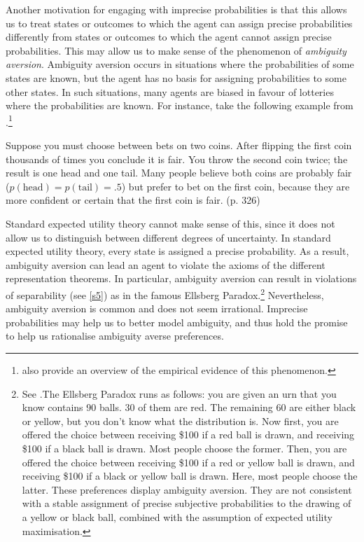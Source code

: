 Another motivation for engaging with imprecise probabilities is that this allows us to treat states or outcomes to which the agent can assign precise probabilities differently from states or outcomes to which the agent cannot assign precise probabilities. This may allow us to make sense of the phenomenon of {\em ambiguity aversion}. Ambiguity aversion occurs in situations where the probabilities of some states are known, but the agent has no basis for assigning probabilities to some other states. In such situations, many agents are biased in favour of lotteries where the probabilities are known. For instance, take the following example from \citet{CamererWeber1992}.\footnote{\citet{CamererWeber1992} also provide an overview of the empirical evidence of this phenomenon.}

\begin{displayquote}
Suppose you must choose between bets on two coins. After flipping the first coin thousands of times you conclude it is fair. You throw the second coin twice; the result is one head and one tail. Many people believe both coins are probably fair ($p(\text{head}) = p(\text{tail})=.5$) but prefer to bet on the first coin, because they are more confident or certain that the first coin is fair. (p. 326)
\end{displayquote}

Standard expected utility theory cannot make sense of this, since it does not allow us to distinguish between different degrees of uncertainty. In standard expected utility theory, every state is assigned a precise probability. As a result, ambiguity aversion can lead an agent to violate the axioms of the different representation theorems. In particular, ambiguity aversion can result in violations of separability (see \autoref{s5}) as in the famous Ellsberg Paradox.\footnote{See \citet{Ellsberg1961}.The Ellsberg Paradox runs as follows: you are given an urn that you know contains 90 balls. 30 of them are red. The remaining 60 are either black or yellow, but you don't know what the distribution is. Now first, you are offered the choice between receiving \$100 if a red ball is drawn, and receiving \$100 if a black ball is drawn. Most people choose the former. Then, you are offered the choice between receiving \$100 if a red or yellow ball is drawn, and receiving \$100 if a black or yellow ball is drawn. Here, most people choose the latter. These preferences display ambiguity aversion. They are not consistent with a stable assignment of precise subjective probabilities to the drawing of a yellow or black ball, combined with the assumption of expected utility maximisation.} Nevertheless, ambiguity aversion is common and does not seem irrational. Imprecise probabilities may help us to better model ambiguity, and thus hold the promise to help us rationalise ambiguity averse preferences.

